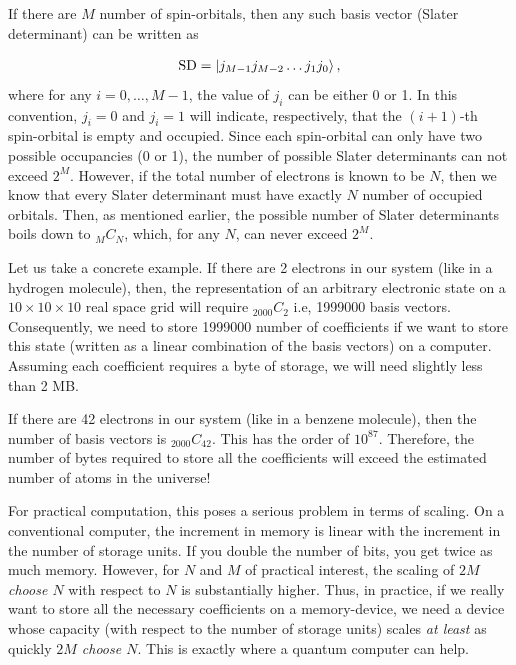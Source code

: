 \documentclass[12pt,oneside]{book}
\begin{document}
If there are $M$ number of spin-orbitals, then any such basis vector (Slater determinant) can be written as

\begin{align}\label{SD_OccupationRepresentation}
    \mathrm{SD}=\ket{j_{M-1}j_{M-2}\hdots j_1 j_0},
\end{align}
where for any $i=0,\hdots,M-1$, the value of $j_i$ can be either 0 or 1. In this convention, $j_i=0$ and $j_i=1$ will indicate, respectively, that the $(i+1)$-th spin-orbital is empty and occupied. Since each spin-orbital can only have two possible occupancies (0 or 1), the number of possible Slater determinants can not exceed $2^M$. However, if the total number of electrons is known to be $N$, then we know that every Slater determinant must have exactly $N$ number of occupied orbitals. Then, as mentioned earlier, the possible number of Slater determinants boils down to $_MC_N$, which, for any $N$, can never exceed $2^M$.

Let us take a concrete example. If there are 2 electrons in our system (like in a hydrogen molecule), then, the representation of an arbitrary electronic state on a $10 \times 10 \times 10$ real space grid will require $_{2000}C_2$ i.e, 1999000 basis vectors. Consequently, we need to store 1999000 number of coefficients if we want to store this state (written as a linear combination of the basis vectors) on a computer. Assuming each coefficient requires a byte of storage, we will need slightly less than 2 MB. 

If there are 42 electrons in our system (like in a benzene molecule), then the number of basis vectors is $_{2000}C_{42}$. This has the order of $10^{87}$. Therefore, the number of bytes required to store all the coefficients will exceed the estimated number of atoms in the universe!

For practical computation, this poses a serious problem in terms of scaling. On a conventional computer, the increment in memory is linear with the increment in the number of storage units. If you double the number of bits, you get twice as much memory. However, for $N$ and $M$ of practical interest, the scaling of \textit{$2M$ choose $N$} with respect to $N$ is substantially higher. Thus, in practice, if we really want to store all the necessary coefficients on a memory-device, we need a device whose capacity (with respect to the number of storage units) scales \textit{at least} as quickly \textit{$2M$ choose $N$}. This is exactly where a quantum computer can help.
\end{document}
